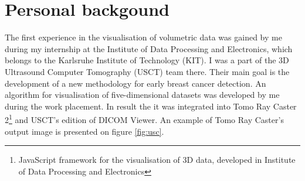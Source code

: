 \documentclass[twoside, english, 11pt]{report}
\begin{document}
\section{Personal backgound}

The first experience in the visualisation of volumetric data was gained by me during my internship at the Institute of Data Processing and Electronics, which belongs to the Karlsruhe Institute of Technology (KIT). I was a part of the 3D Ultrasound Computer Tomography (USCT) team there. Their main goal is the development of a new methodology for early breast cancer detection. An algorithm for visualisation of five-dimensional datasets was developed by me during the work placement. In result the it was integrated into Tomo Ray Caster 2\footnote{JavaScript framework for the visualisation of 3D data, developed in Institute of Data Processing and Electronics} and USCT's edition of DICOM Viewer. An example of Tomo Ray Caster's output image is presented on figure \ref{fig:usc}.\\
\end{document}
